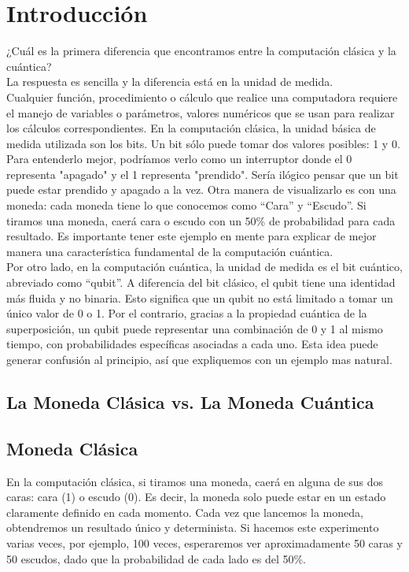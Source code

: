 \section*{Introducción}
\noindent 
¿Cuál es la primera diferencia que encontramos entre la computación clásica y la cuántica? \\
\noindent 
La respuesta es sencilla y la diferencia está en la unidad de medida. \\[0.5em]
\noindent 
Cualquier función, procedimiento o cálculo que realice una computadora requiere el manejo de variables o parámetros, valores numéricos que se usan para realizar los cálculos correspondientes. En la computación clásica, la unidad básica de medida utilizada son los bits. Un bit sólo puede tomar dos valores posibles: 1 y 0.\\[0.5em]
\noindent 
Para entenderlo mejor, podríamos verlo como un interruptor donde el 0 representa "apagado" y el 1 representa "prendido". Sería ilógico pensar que un bit puede estar prendido y apagado a la vez. Otra manera de visualizarlo es con una moneda: cada moneda tiene lo que conocemos como “Cara” y “Escudo”. Si tiramos una moneda, caerá cara o escudo con un 50\% de probabilidad para cada resultado. Es importante tener este ejemplo en mente para explicar de mejor manera una característica fundamental de la computación cuántica.\\[0.5em]
\noindent 
Por otro lado, en la computación cuántica, la unidad de medida es el bit cuántico, abreviado como “qubit”. A diferencia del bit clásico, el qubit tiene una identidad más fluida y no binaria. Esto significa que un qubit no está limitado a tomar un único valor de 0 o 1. Por el contrario, gracias a la propiedad cuántica de la superposición, un qubit puede representar una combinación de 0 y 1 al mismo tiempo, con probabilidades específicas asociadas a cada uno. Esta idea puede generar confusión al principio, así que expliquemos con un ejemplo mas natural.
\noindent 
\subsection*{La Moneda Clásica vs. La Moneda Cuántica}

\subsection*{Moneda Clásica}
\noindent
En la computación clásica, si tiramos una moneda, caerá en alguna de sus dos caras: cara (1) o escudo (0). Es decir, la moneda solo puede estar en un estado claramente definido en cada momento. Cada vez que lancemos la moneda, obtendremos un resultado único y determinista. Si hacemos este experimento varias veces, por ejemplo, 100 veces, esperaremos ver aproximadamente 50 caras y 50 escudos, dado que la probabilidad de cada lado es del 50\%.

